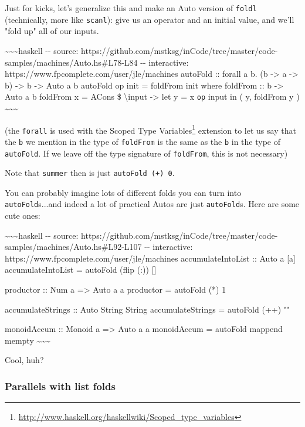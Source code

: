 \documentclass[]{article}
\renewcommand{\href}[2]{#2\footnote{\url{#1}}}
\begin{document}
Just for kicks, let's generalize this and make an Auto version of \texttt{foldl}
(technically, more like \texttt{scanl}): give us an operator and an initial
value, and we'll "fold up" all of our inputs.

\textasciitilde{}\textasciitilde{}\textasciitilde{}haskell -\/- source:
https://github.com/mstksg/inCode/tree/master/code-samples/machines/Auto.hs\#L78-L84
-\/- interactive: https://www.fpcomplete.com/user/jle/machines autoFold ::
forall a b. (b -\textgreater{} a -\textgreater{} b) -\textgreater{} b
-\textgreater{} Auto a b autoFold op init = foldFrom init where foldFrom :: b
-\textgreater{} Auto a b foldFrom x = ACons \$ \textbackslash{}input
-\textgreater{} let y = x \texttt{op} input in ( y, foldFrom y )
\textasciitilde{}\textasciitilde{}\textasciitilde{}

(the \texttt{forall} is used with the
\href{http://www.haskell.org/haskellwiki/Scoped_type_variables}{Scoped Type
Variables} extension to let us say that the \texttt{b} we mention in the type of
\texttt{foldFrom} is the same as the \texttt{b} in the type of
\texttt{autoFold}. If we leave off the type signature of \texttt{foldFrom}, this
is not necessary)

Note that \texttt{summer} then is just \texttt{autoFold\ (+)\ 0}.

You can probably imagine lots of different folds you can turn into
\texttt{autoFold}s...and indeed a lot of practical Autos are just
\texttt{autoFold}s. Here are some cute ones:

\textasciitilde{}\textasciitilde{}\textasciitilde{}haskell -\/- source:
https://github.com/mstksg/inCode/tree/master/code-samples/machines/Auto.hs\#L92-L107
-\/- interactive: https://www.fpcomplete.com/user/jle/machines
accumulateIntoList :: Auto a {[}a{]} accumulateIntoList = autoFold (flip (:))
{[}{]}

productor :: Num a =\textgreater{} Auto a a productor = autoFold (*) 1

accumulateStrings :: Auto String String accumulateStrings = autoFold (++) ""

monoidAccum :: Monoid a =\textgreater{} Auto a a monoidAccum = autoFold mappend
mempty \textasciitilde{}\textasciitilde{}\textasciitilde{}

Cool, huh?

\subsubsection{Parallels with list folds}
\end{document}
